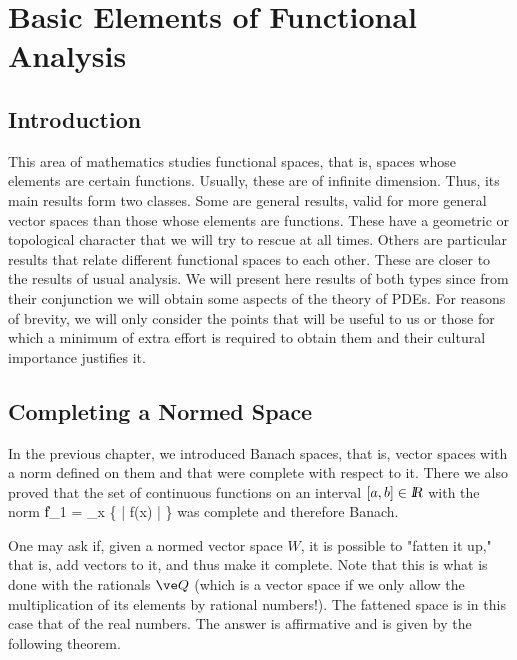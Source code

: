 \chapter{Basic Elements of Functional Analysis}
\label{elementos_basicos_de_analisis_funcional}

\section{Introduction}
This area of mathematics studies functional spaces, that is, spaces whose elements are certain functions. Usually, these are of infinite dimension. Thus, its main results form two classes. Some are general results, valid for more general vector spaces than those whose elements are functions. These have a geometric or topological character that we will try to rescue at all times. Others are particular results that relate different functional spaces to each other. These are closer to the results of usual analysis. We will present here results of both types since from their conjunction we will obtain some aspects of the theory of PDEs. For reasons of brevity, we will only consider the points that will be useful to us or those for which a minimum of extra effort is required to obtain them and their cultural importance justifies it.


\section{Completing a Normed Space}


In the previous chapter, we introduced Banach spaces, that is, vector spaces with a norm defined on them and that were complete with respect to it. There we also proved that the set of continuous functions on an interval $[a,b] \in \mbox{\sl {l$\!\!\!\;\:\!$R}}$ with the norm
\beq
\|f\|_1 = \sup_{x \in [a,b]} \{ | f(x) | \}
\eeq
was complete and therefore Banach.

One may ask if, given a normed vector space $W$, it is possible to "fatten it up," that is, add vectors to it, and thus make it complete. Note that this is what is done with the rationals $\ve Q$ (which is a vector space if we only allow the multiplication of its elements by rational numbers!). The fattened space is in this case that of the real numbers. The answer is affirmative and is given by the following theorem.

